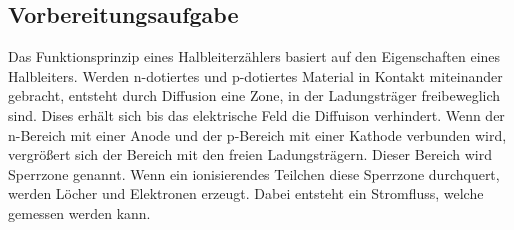 \subsection{Vorbereitungsaufgabe}
\label{sec:Vorbereitungsaufgabe}

Das Funktionsprinzip eines Halbleiterzählers basiert auf den Eigenschaften eines Halbleiters.
Werden n-dotiertes und p-dotiertes Material in Kontakt miteinander gebracht, entsteht durch Diffusion eine Zone, in 
der Ladungsträger freibeweglich sind. Dises erhält sich bis das elektrische Feld die Diffuison verhindert.
Wenn der n-Bereich mit einer Anode und der p-Bereich mit einer Kathode verbunden wird, vergrößert sich der Bereich
mit den freien Ladungsträgern. Dieser Bereich wird Sperrzone genannt.
Wenn ein ionisierendes Teilchen diese Sperrzone durchquert, werden Löcher und Elektronen erzeugt. Dabei entsteht
ein Stromfluss, welche gemessen werden kann.
